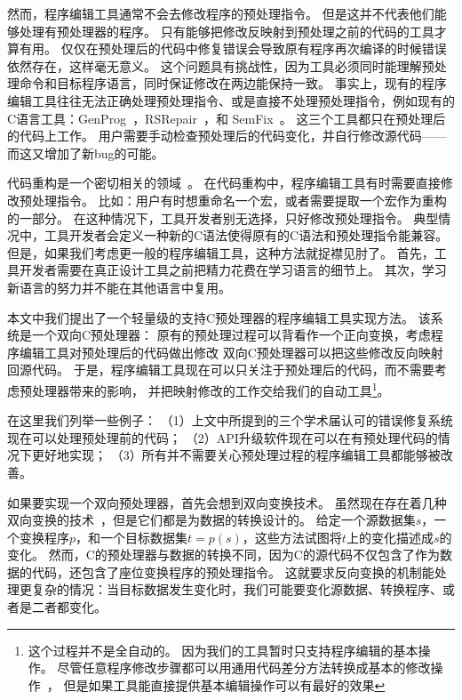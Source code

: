 然而，程序编辑工具通常不会去修改程序的预处理指令。
但是这并不代表他们能够处理有预处理器的程序。
只有能够把修改反映射到预处理之前的代码的工具才算有用。
仅仅在预处理后的代码中修复错误会导致原有程序再次编译的时候错误依然存在，这样毫无意义。
这个问题具有挑战性，因为工具必须同时能理解预处理命令和目标程序语言，同时保证修改在两边能保持一致。
事实上，现有的程序编辑工具往往无法正确处理预处理指令、或是直接不处理预处理指令，例如现有的C语言工具：GenProg~\parencite{le2012genprog,le2012systematic}，RSRepair~\parencite{QiMLDW14}，和
SemFix~\parencite{nguyen2013semfix}。
这三个工具都只在预处理后的代码上工作。
用户需要手动检查预处理后的代码变化，并自行修改源代码——而这又增加了新bug的可能。

代码重构是一个密切相关的领域~\parencite{McCloskey:2005,Garrido2013}。
在代码重构中，程序编辑工具有时需要直接修改预处理指令。
比如：用户有时想重命名一个宏，或者需要提取一个宏作为重构的一部分。
在这种情况下，工具开发者别无选择，只好修改预处理指令。
典型情况中，工具开发者会定义一种新的C语法使得原有的C语法和预处理指令能兼容。
但是，如果我们考虑更一般的程序编辑工具，这种方法就捉襟见肘了。
首先，工具开发者需要在真正设计工具之前把精力花费在学习语言的细节上。
其次，学习新语言的努力并不能在其他语言中复用。

本文中我们提出了一个轻量级的支持C预处理器的程序编辑工具实现方法。
该系统是一个双向C预处理器：
原有的预处理过程可以背看作一个正向变换，考虑程序编辑工具对预处理后的代码做出修改
双向C预处理器可以把这些修改反向映射回源代码。
于是，程序编辑工具现在可以只关注于预处理后的代码，而不需要考虑预处理器带来的影响，
并把映射修改的工作交给我们的自动工具\footnote{这个过程并不是全自动的。
因为我们的工具暂时只支持程序编辑的基本操作。
尽管任意程序修改步骤都可以用通用代码差分方法转换成基本的修改操作~\parencite{fluri2007change}，
但是如果工具能直接提供基本编辑操作可以有最好的效果}。




在这里我们列举一些例子：
（1）上文中所提到的三个学术届认可的错误修复系统现在可以处理预处理前的代码；
（2）API升级软件现在可以在有预处理代码的情况下更好地实现；
（3）所有并不需要关心预处理过程的程序编辑工具都能够被改善。


如果要实现一个双向预处理器，首先会想到双向变换技术。
虽然现在存在着几种双向变换的技术~\parencite{MaHNHT07,Voigtlander09bff,voigtlander2010combining}，但是它们都是为数据的转换设计的。
给定一个源数据集$s$，一个变换程序$p$，和一个目标数据集$t=p(s)$，这些方法试图将$t$上的变化描述成$s$的变化。
然而，C的预处理器与数据的转换不同，因为C的源代码不仅包含了作为数据的代码，还包含了座位变换程序的预处理指令。
这就要求反向变换的机制能处理更复杂的情况：当目标数据发生变化时，我们可能要变化源数据、转换程序、或者是二者都变化。

